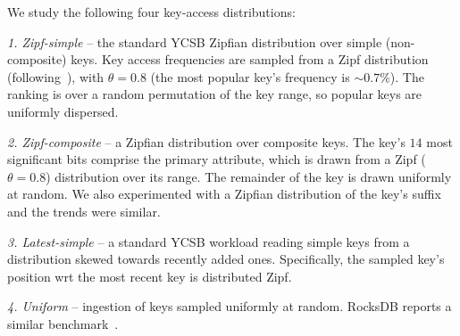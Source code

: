 \noindent
We study the following four key-access distributions:  

\emph{1. Zipf-simple} -- the standard YCSB Zipfian distribution over simple (non-composite) keys. 
Key access frequencies are sampled from a Zipf distribution 
(following~\cite{Gray:1994:QGB:191839.191886}), with $\theta = 0.8$
(the most popular key's frequency is  $\sim 0.7\%$). 
The ranking is over a random permutation of the key range, so popular keys are uniformly dispersed. %

\emph{2. Zipf-composite} -- a Zipfian distribution over composite keys.
The key's $14$ most significant bits comprise the primary attribute, which  
is drawn from a Zipf ($\theta=0.8$) distribution over its range. The remainder of the key is drawn uniformly at random.
We also experimented with a Zipfian distribution of the key's suffix and 
the trends were similar. %

\emph{3. Latest-simple} -- a standard YCSB workload reading simple keys from a distribution skewed towards recently added ones. 
Specifically, the sampled key's position wrt the most recent key is distributed Zipf. 

\emph{4. Uniform} -- ingestion of keys sampled uniformly at random. RocksDB
reports a similar benchmark~\cite{rocksdb-benchmarks}. %

